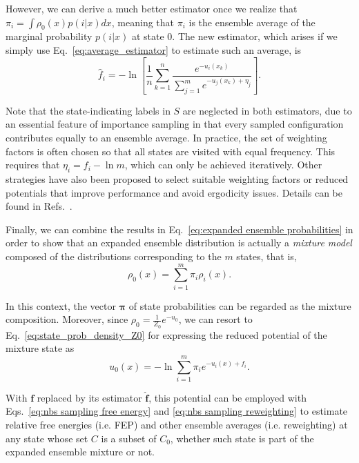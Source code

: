 \documentclass[aip,jcp,reprint,amsmath,amssymb]{revtex4-1}
\newcommand{\vt}[1]{\boldsymbol{\mathbf{#1}}}           %
\begin{document}
However, we can derive a much better estimator\cite{Ding_2017} once we realize that $\pi_i = \int \rho_0(x) p(i|x) dx$, meaning that $\pi_i$ is the ensemble average of the marginal probability $p(i|x)$ at state $0$. The new estimator, which arises if we simply use Eq.~\eqref{eq:average_estimator} to estimate such an average, is
\begin{equation}
\label{eq:expanded ensemble FEP estimator}
\hat f_i = -\ln \left[ \frac{1}{n}\sum_{k=1}^n \frac{e^{-u_i(x_k)}}{\sum_{j=1}^m e^{-u_j(x_k) + \eta_j}} \right].
\end{equation}

Note that the state-indicating labels in $S$ are neglected in both estimators, due to an essential feature of importance sampling in that every sampled configuration contributes equally to an ensemble average. In practice, the set of weighting factors is often chosen so that all states are visited with equal frequency. This requires that $\eta_i = f_i - \ln m$, which can only be achieved iteratively. Other strategies have also been proposed to select suitable weighting factors or reduced potentials that improve performance and avoid ergodicity issues. Details can be found in Refs.~.

Finally, we can combine the results in Eq.~\eqref{eq:expanded ensemble probabilities} in order to show that an expanded ensemble distribution is actually a \textit{mixture model}\cite{Lindsay_1995, Marin_2005} composed of the distributions corresponding to the $m$ states, that is,
\begin{equation}
\label{eq:mixture ensemble}
\rho_0(x) = \sum_{i=1}^m \pi_i \rho_i(x).
\end{equation}

In this context, the vector $\vt \pi$ of state probabilities can be regarded as the mixture composition. Moreover, since $\rho_0 = \frac{1}{Z_0}e^{-u_0}$, we can resort to Eq.~\eqref{eq:state_prob_density_Z0} for expressing the reduced potential of the mixture state as
\begin{equation}
\label{eq:mixture potential}
u_0(x) = -\ln \sum_{i=1}^m \pi_i e^{-u_i(x) + f_i}.
\end{equation}

With $\vt f$ replaced by its estimator $\hat{\vt f}$, this potential can be employed with Eqs.~\eqref{eq:nbs sampling free energy} and \eqref{eq:nbs sampling reweighting} to estimate relative free energies (i.e. FEP) and other ensemble averages (i.e. reweighting) at any state whose set $C$ is a subset of $C_0$, whether such state is part of the expanded ensemble mixture or not.
\end{document}
